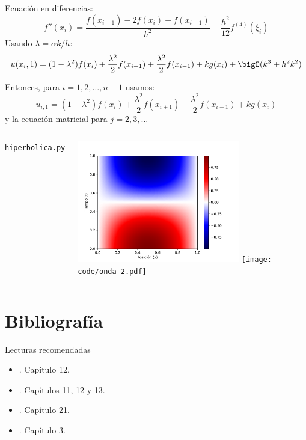 \documentclass[9pt, aspectratio=169]{beamer}
\begin{document}
\begin{frame}
Ecuación en diferencias:
\[ f''(x_i) = \frac{f(x_{i+1}) - 2 f(x_i) + f(x_{i-1})}{h^2} - \frac{h^2}{12} f^{(4)}(\xi_i) \]
Usando $\lambda = \alpha k / h$:
\[ u(x_i, 1) = (1-\lambda^2)f(x_i) + \frac{\lambda^2}{2} f(x_{i+1}) + \frac{\lambda^2}{2} f(x_{i-1}) + k g(x_i) + \bigO(k^3 + h^2 k^2) \]

Entonces, para $i = 1, 2, \ldots, n-1$ usamos:
\[ u_{i, 1} = (1-\lambda^2)f(x_i) + \frac{\lambda^2}{2} f(x_{i+1}) + \frac{\lambda^2}{2} f(x_{i-1}) + k g(x_i) \]
y la ecuación matricial para $j = 2, 3, \ldots$

\end{frame}

\begin{frame}
\begin{columns}
\texttt{hiperbolica.py}
\pause

\begin{center}
    \includegraphics[width=0.7\textwidth]{code/onda-1.pdf}
    \texttt{[image: code/onda-2.pdf]}
\end{center}
\end{columns}
\end{frame}

\section*{Bibliografía}
\begin{frame}[allowframebreaks]{Lecturas recomendadas}
\begin{itemize}
    \item {}. Capítulo 12.
    \item {}. Capítulos 11, 12 y 13.
\item {}. Capítulo 21.
    \item {}. Capítulo 3.
\end{itemize}
\end{frame}
\end{document}
